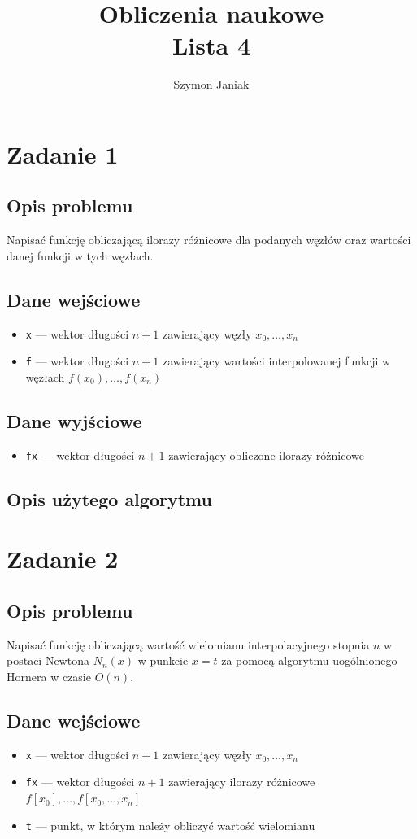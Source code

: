 \documentclass{article}
\title{%
	Obliczenia naukowe \\
	\large Lista 4}
\author{Szymon Janiak}
\begin{document}
\maketitle

\section*{Zadanie 1}
\subsection*{Opis problemu}
	Napisać funkcję obliczającą ilorazy różnicowe dla podanych węzłów oraz wartości danej funkcji w tych węzłach.
\subsection*{Dane wejściowe}\label{1.in-data}
	\begin{itemize}
		\item \texttt{x} — wektor długości $n+1$ zawierający węzły $x_0,\dots,x_n$
		\item \texttt{f} — wektor długości $n+1$ zawierający wartości interpolowanej funkcji w węzłach $f(x_0), \dots, f(x_n)$
	\end{itemize}
\subsection*{Dane wyjściowe}
	\begin{itemize}
	    \item \texttt{fx} — wektor długości $n+1$ zawierający obliczone ilorazy różnicowe
	\end{itemize}
\subsection*{Opis użytego algorytmu}

\section*{Zadanie 2}
\subsection*{Opis problemu}
	Napisać funkcję obliczającą wartość wielomianu interpolacyjnego stopnia $n$ w postaci Newtona $N_n(x)$ w punkcie $x = t$ za pomocą algorytmu uogólnionego Hornera w czasie $O(n)$.
\subsection*{Dane wejściowe}
	\begin{itemize}
	    \item \texttt{x} — wektor długości $n+1$ zawierający węzły $x_0,\dots,x_n$
	    \item \texttt{fx} — wektor długości $n+1$ zawierający ilorazy różnicowe $f[x_0], \dots, f[x_0,\dots,x_n]$
	    \item \texttt{t} — punkt, w którym należy obliczyć wartość wielomianu
	\end{itemize}
\end{document}

